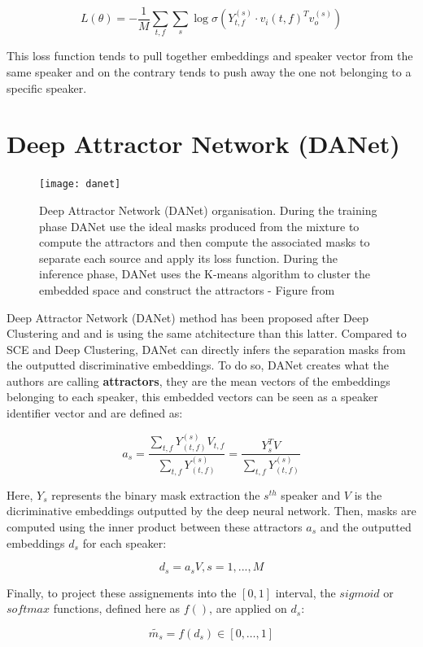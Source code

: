 \documentclass[master, tikz, final,11pt, dvipdfmx]{iscs-thesis}
\begin{document}
\


\[L(\theta) = - \frac{1}{M} \sum_{t,f} \sum_{s} \log \sigma(Y_{t,f}^{(s)} \cdot v_i(t,f)^{T} v_o^{(s)})\]

This loss function tends to pull together embeddings and speaker vector from the same speaker and on the contrary tends to push away the one not belonging to a specific speaker.


\section{Deep Attractor Network (DANet)}

\begin{figure}[ht]
\centering
\texttt{[image: danet]}
\caption[Deep Attractor Network Architecture]{ Deep Attractor Network (DANet) organisation. During the training phase DANet use the ideal masks produced from the mixture to compute the attractors and then compute the associated masks to separate each source and apply its loss function. During the inference phase, DANet uses the K-means algorithm to cluster the embedded space and construct the attractors - Figure from \cite{DANet}}
\label{fig:danet}
\end{figure}

Deep Attractor Network (DANet) \cite{DANet} method has been proposed 
after Deep Clustering and and is using the same atchitecture than this latter. Compared to SCE and Deep Clustering, DANet can directly infers the separation masks from the outputted discriminative embeddings. To do so, DANet creates what the authors are calling \textbf{attractors}, they are the mean vectors of the embeddings belonging to each speaker, this embedded vectors can be seen as a speaker identifier vector and are defined as:

\[a_s = \frac{\sum_{t,f}{Y_{(t,f)}^{(s)}V_{t,f} }}{\sum_{t,f}{Y_{(t,f)}^{(s)}}} = \frac{{Y_s^TV}}{\sum_{t,f}{Y_{(t,f)}^{(s)}}}\]

Here, $Y_s$ represents the binary mask extraction the $s^{th}$ speaker and $V$ is the dicriminative embeddings outputted by the deep neural network.
Then, masks are computed using the inner product between these attractors $a_s$ and the outputted embeddings $d_s$ for each speaker:

\[d_s = a_sV, s = 1,..., M \]

Finally, to project these assignements into the $[0, 1]$ interval, the $sigmoid$ or $softmax$ functions, defined here as $f()$, are applied on $d_s$:

\[\tilde{m_s} = f(d_s) \in [0,\dots,1] \]
\end{document}

